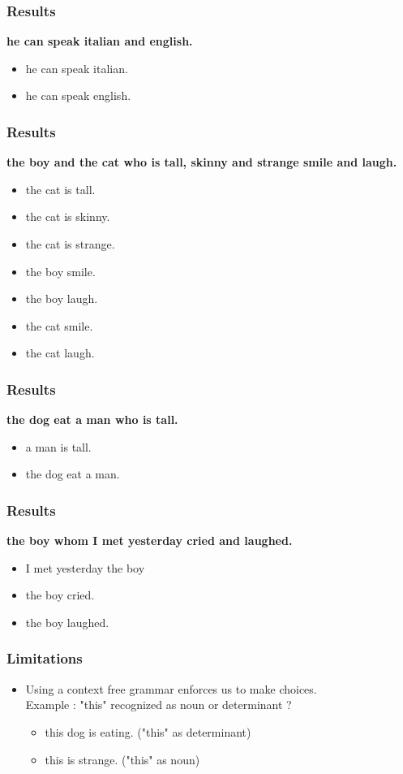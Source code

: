 \documentclass{beamer}
\begin{document}
\begin{frame}
    \frametitle{Results}
    \textbf{he can speak italian and english.}
    \begin{itemize}
        \item he can speak italian.
        \item he can speak english.
    \end{itemize}
\end{frame}

\begin{frame}
    \frametitle{Results}
    \textbf{the boy and the cat who is tall, skinny and strange smile and laugh.}
    \begin{itemize}
        \item the cat is tall.
        \item the cat is skinny.
        \item the cat is strange.
        \item the boy smile.
        \item the boy laugh.
        \item the cat smile.
        \item the cat laugh.
    \end{itemize}
\end{frame}

\begin{frame}
    \frametitle{Results}
    \textbf{the dog eat a man who is tall.}
    \begin{itemize}
        \item a man is tall.
        \item the dog eat a man.
    \end{itemize}
\end{frame}

\begin{frame}
    \frametitle{Results}
    \textbf{the boy whom I met yesterday cried and laughed.}
    \begin{itemize}
        \item I met yesterday the boy
        \item the boy cried.
        \item the boy laughed.
    \end{itemize}
\end{frame}

\begin{frame}
    \frametitle{Limitations}
    \begin{itemize}
        \item Using a context free grammar enforces us to make choices. \\ Example : "this" recognized as noun or determinant ?
        \begin{itemize}
            \item this dog is eating. ("this" as determinant)
            \item this is strange. ("this" as noun)
        \end{itemize}
    \end{itemize}
\end{frame}
\end{document}
